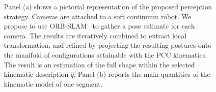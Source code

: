 \begin{figure}[ht]
     \centering
     \caption{ Panel (a) shows a pictorial representation of the proposed perception strategy. Cameras are attached to a soft continuum robot. We propose to use ORB-SLAM~\cite{mur2017orb} to gather a pose estimate for each camera. The results are iteratively combined to extract local transformation, and refined by projecting the resulting postures onto the manifold of configurations attainable with the \gls{PCC} kinematics. The result is an estimation of the full shape within the selected kinematic description $\hat{q}$. Panel (b) reports the main quantities of the kinematic model of one segment. }
\end{figure}